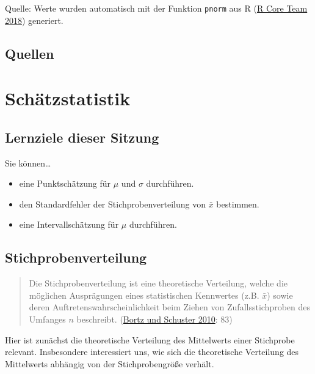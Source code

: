 \documentclass[
  ngerman,
]{article}
\providecommand{\tightlist}{%
  \setlength{\itemsep}{0pt}\setlength{\parskip}{0pt}}
\begin{document}
Quelle: Werte wurden automatisch mit der Funktion \texttt{pnorm} aus R (\protect\hyperlink{ref-r}{R Core Team 2018}) generiert.

\pagebreak

\hypertarget{quellen-2}{%
\subsection{Quellen}\label{quellen-2}}

\hypertarget{schuxe4tzstatistik-1}{%
\section{Schätzstatistik}\label{schuxe4tzstatistik-1}}

\hypertarget{lernziele-dieser-sitzung-3}{%
\subsection{Lernziele dieser Sitzung}\label{lernziele-dieser-sitzung-3}}

Sie können\ldots{}

\begin{itemize}
\tightlist
\item
  eine Punktschätzung für \(\mu\) und \(\sigma\) durchführen.
\item
  den Standardfehler der Stichprobenverteilung von \(\bar{x}\) bestimmen.
\item
  eine Intervallschätzung für \(\mu\) durchführen.
\end{itemize}

\hypertarget{stichprobenverteilung}{%
\subsection{Stichprobenverteilung}\label{stichprobenverteilung}}

\begin{quote}
Die Stichprobenverteilung ist eine theoretische Verteilung, welche die möglichen Ausprägungen eines statistischen Kennwertes (z.B. \(\bar{x}\)) sowie deren Auftretenswahrscheinlichkeit beim Ziehen von Zufallsstichproben des Umfanges \(n\) beschreibt. (\protect\hyperlink{ref-bortz}{Bortz und Schuster 2010}: 83)
\end{quote}

Hier ist zunächst die theoretische Verteilung des Mittelwerts einer Stichprobe relevant. Insbesondere interessiert uns, wie sich die theoretische Verteilung des Mittelwerts abhängig von der Stichprobengröße verhält.
\end{document}

